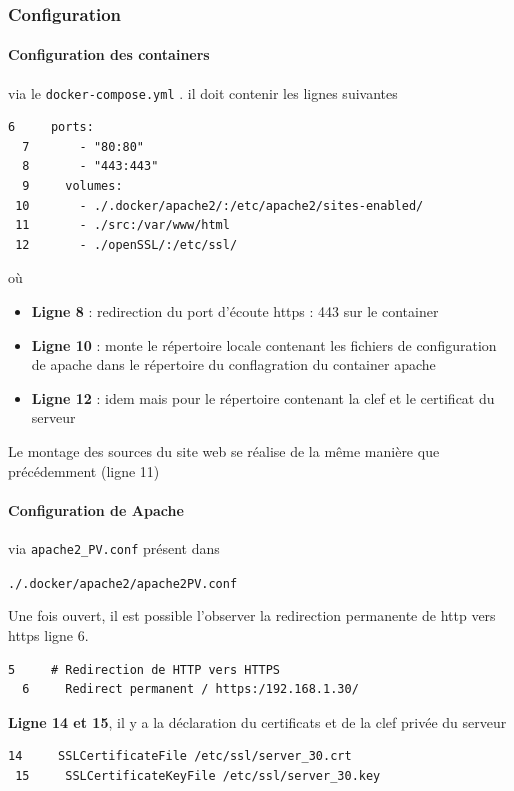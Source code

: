 \documentclass[french, 12pt]{article}%
\newcommand{\itemE}{\item[$\bullet$]}
\begin{document}
\subsubsection{Configuration }


\paragraph{Configuration des containers} via le  \verb?docker-compose.yml? . il doit contenir les lignes suivantes 

\begin{lstlisting}[style=commande]
  6     ports:
  7       - "80:80"
  8       - "443:443"
  9     volumes:
 10       - ./.docker/apache2/:/etc/apache2/sites-enabled/
 11       - ./src:/var/www/html
 12       - ./openSSL/:/etc/ssl/
\end{lstlisting}

où 
\begin{itemize}
\itemE \textbf{Ligne 8} : redirection du port d'écoute https : 443 sur le container 
\itemE \textbf{Ligne 10} : monte le répertoire locale contenant les fichiers de configuration de apache dans le répertoire du conflagration du container apache
\itemE \textbf{Ligne 12} : idem mais pour le répertoire contenant la clef et le certificat du serveur 
\end{itemize}

Le montage des sources du site web se réalise de la même manière que précédemment (ligne 11)

\paragraph{Configuration de Apache} via \verb?apache2_PV.conf? présent dans 

\verb?./.docker/apache2/apache2PV.conf?

Une fois ouvert, il est possible l'observer la redirection permanente de http vers https  ligne 6.
\begin{lstlisting}[style=commande]
  5     # Redirection de HTTP vers HTTPS
  6     Redirect permanent / https:/192.168.1.30/
\end{lstlisting}

\textbf{Ligne 14 et 15}, il y a la déclaration du certificats et de la clef privée du serveur 
\begin{lstlisting}[style=commande]
 14     SSLCertificateFile /etc/ssl/server_30.crt
 15     SSLCertificateKeyFile /etc/ssl/server_30.key
\end{lstlisting}
\end{document}
